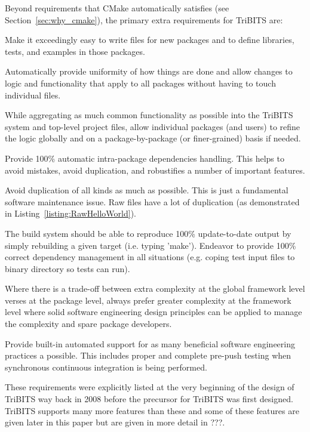 \documentclass[note]{TechNote}
\begin{document}
Beyond requirements that CMake automatically satisfies (see Section~\ref{sec:why_cmake}), the primary extra requirements for TriBITS are:
\begin{compactitem}
\item Make it exceedingly easy to write  files for new packages and to define libraries, tests, and examples in those packages.
\item Automatically provide uniformity of how things are done and allow changes to logic and functionality that apply to all  packages without having to touch individual  files.
\item While aggregating as much common functionality as possible into the TriBITS system and top-level project files, allow individual packages (and users) to refine the logic globally and on a package-by-package (or finer-grained) basis if needed.
\item Provide 100\% automatic intra-package dependencies handling.  This helps to avoid mistakes, avoid duplication, and robustifies a number of important features.
\item Avoid duplication of all kinds as much as possible.  This is just a fundamental software maintenance issue.  Raw  files have a lot of duplication (as demonstrated in Listing~\ref{listing:RawHelloWorld}).
\item The build system should be able to reproduce 100\% update-to-date output by simply rebuilding a given target (i.e. typing 'make').  Endeavor to provide 100\% correct dependency management in all situations (e.g. coping test input files to binary directory so tests can run).
\item Where there is a trade-off between extra complexity at the global framework level verses at the package level, always prefer greater complexity at the framework level where solid software engineering design principles can be applied to manage the complexity and spare package developers.
\item Provide built-in automated support for as many beneficial software engineering practices a possible.  This includes proper and complete pre-push testing when synchronous continuous integration is being performed.
\end{compactitem}

These requirements were explicitly listed at the very beginning of the design of TriBITS way back in 2008 before the precursor for TriBITS was first designed.  TriBITS supports many more features than these and some of these features are given later in this paper but are given in more detail in ???.
\end{document}

